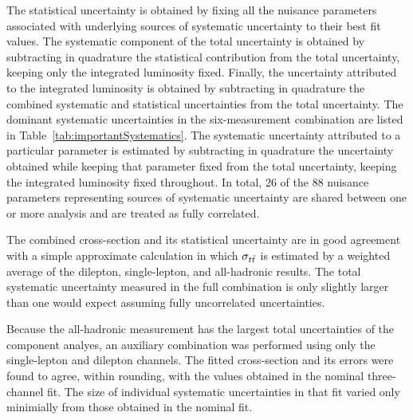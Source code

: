 The statistical uncertainty is obtained by fixing all the nuisance parameters associated with underlying sources of systematic uncertainty to their best fit values.  
The systematic component of the total uncertainty is obtained by subtracting in quadrature the statistical contribution from the total uncertainty, keeping only the integrated luminosity fixed.
Finally, the uncertainty attributed to the integrated luminosity is obtained by subtracting in quadrature the combined systematic and statistical uncertainties from the total uncertainty.
The dominant systematic uncertainties in the six-measurement combination are listed in Table~\ref{tab:importantSystematics}. 
The systematic uncertainty attributed to a particular parameter is estimated by subtracting in quadrature the uncertainty obtained
while keeping that parameter fixed from the total uncertainty, keeping the integrated luminosity fixed throughout.
In total, 26 of the 88 nuisance parameters representing sources of systematic uncertainty are shared between one or more analysis and are treated as fully correlated.

The combined cross-section and its statistical uncertainty are in good agreement with a simple approximate calculation in which $\sigma_{t\bar{t}}$ is estimated by a weighted average of the dilepton, single-lepton, and all-hadronic results.
The total systematic uncertainty measured in the full combination is only slightly larger than one would expect assuming fully uncorrelated uncertainties. 

Because the all-hadronic measurement has the largest total uncertainties of the component analyes, an auxiliary combination was performed using only the single-lepton and dilepton channels.
The fitted cross-section and its errors were found to agree, within rounding, with the values obtained in the nominal three-channel fit.
The size of individual systematic uncertainties in that fit varied only minimially from those obtained in the nominal fit.

